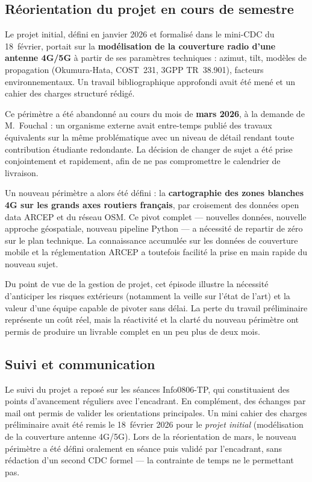 \documentclass[11pt,a4paper]{article}
\begin{document}
\subsection{Réorientation du projet en cours de semestre}

Le projet initial, défini en janvier 2026 et formalisé dans le mini-CDC du 18~février, portait sur la \textbf{modélisation de la couverture radio d'une antenne 4G/5G} à partir de ses paramètres techniques : azimut, tilt, modèles de propagation (Okumura-Hata, COST~231, 3GPP TR~38.901), facteurs environnementaux. Un travail bibliographique approfondi avait été mené et un cahier des charges structuré rédigé.

Ce périmètre a été abandonné au cours du mois de \textbf{mars 2026}, à la demande de M.~Fouchal : un organisme externe avait entre-temps publié des travaux équivalents sur la même problématique avec un niveau de détail rendant toute contribution étudiante redondante. La décision de changer de sujet a été prise conjointement et rapidement, afin de ne pas compromettre le calendrier de livraison.

Un nouveau périmètre a alors été défini : la \textbf{cartographie des zones blanches 4G sur les grands axes routiers français}, par croisement des données open data ARCEP et du réseau OSM. Ce pivot complet — nouvelles données, nouvelle approche géospatiale, nouveau pipeline Python — a nécessité de repartir de zéro sur le plan technique. La connaissance accumulée sur les données de couverture mobile et la réglementation ARCEP a toutefois facilité la prise en main rapide du nouveau sujet.

Du point de vue de la gestion de projet, cet épisode illustre la nécessité d'anticiper les risques extérieurs (notamment la veille sur l'état de l'art) et la valeur d'une équipe capable de pivoter sans délai. La perte du travail préliminaire représente un coût réel, mais la réactivité et la clarté du nouveau périmètre ont permis de produire un livrable complet en un peu plus de deux mois.

\subsection{Suivi et communication}

Le suivi du projet a reposé sur les séances Info0806-TP, qui constituaient des points d'avancement réguliers avec l'encadrant. En complément, des échanges par mail ont permis de valider les orientations principales. Un mini cahier des charges préliminaire avait été remis le 18~février 2026 pour le \emph{projet initial} (modélisation de la couverture antenne 4G/5G). Lors de la réorientation de mars, le nouveau périmètre a été défini oralement en séance puis validé par l'encadrant, sans rédaction d'un second CDC formel — la contrainte de temps ne le permettant pas.
\end{document}
